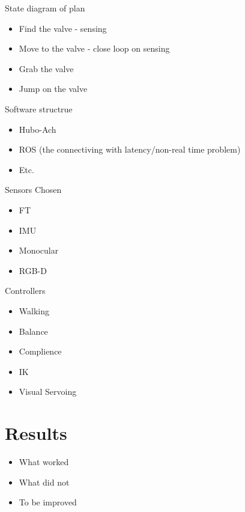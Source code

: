 State diagram of plan
\begin{itemize}
\item Find the valve - sensing
\item Move to the valve - close loop on sensing
\item Grab the valve
\item Jump on the valve
\end{itemize}

Software structrue
\begin{itemize}
\item Hubo-Ach
\item ROS (the connectiving with latency/non-real time problem)

\item Etc.
\end{itemize}


Sensors Chosen
\begin{itemize}
\item FT
\item IMU
\item Monocular
\item RGB-D
\end{itemize}

Controllers
\begin{itemize}
\item Walking
\item Balance
\item Complience
\item IK
\item Visual Servoing
\end{itemize}

\section{Results}\label{sec:results}
\begin{itemize}
\item What worked
\item What did not
\item To be improved
\end{itemize}

